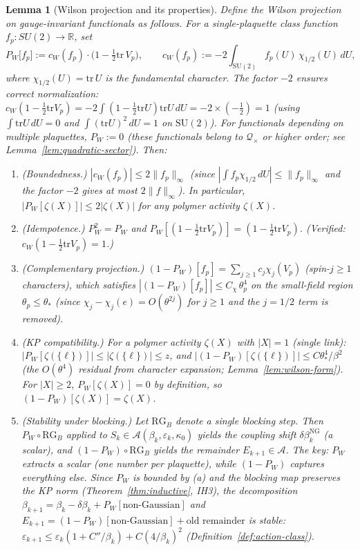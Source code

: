 \documentclass[11pt]{article}
\newtheorem{lemma}[theorem]{Lemma}
\theoremstyle{definition}
\newcommand{\SU}{\mathrm{SU}}
\newcommand{\tr}{\mathrm{tr}}
\newcommand{\R}{\mathbb{R}}
\begin{document}
\begin{lemma}[Wilson projection and its properties]%
\label{lem:wilson-proj}
Define the \emph{Wilson projection} on gauge-invariant
functionals as follows.  For a single-plaquette class function
$f_p:SU(2)\to\R$, set
\begin{equation}\label{eq:wilson-proj}
P_W\bigl[f_p\bigr]
:=c_W(f_p)\cdot\bigl(1-\tfrac{1}{2}\tr\,V_p\bigr),
\qquad
c_W(f_p)
:=-2\int_{\SU(2)}f_p(U)\,\chi_{1/2}(U)\,dU,
\end{equation}
where $\chi_{1/2}(U)=\tr\,U$ is the fundamental character.
The factor $-2$ ensures correct normalization:
$c_W(1-\frac{1}{2}\tr V_p)=-2\int(1-\frac{1}{2}\tr U)
\tr U\,dU=-2\times(-\frac{1}{2})=1$
(using $\int\tr U\,dU=0$ and
$\int(\tr U)^2\,dU=1$ on $\SU(2)$).
For functionals
depending on multiple plaquettes, $P_W:=0$ (these functionals
belong to $\mathcal{Q}_\times$ or higher order;
see Lemma~\ref{lem:quadratic-sector}).
Then:
\begin{enumerate}[nosep,label=(\alph*)]
\item \emph{(Boundedness.)}
$|c_W(f_p)|\le 2\|f_p\|_\infty$ (since
$|\int f_p\chi_{1/2}\,dU|\le\|f_p\|_\infty$
and the factor $-2$ gives at most $2\|f\|_\infty$).
In particular, $|P_W[\zeta(X)]|\le 2|\zeta(X)|$ for
any polymer activity $\zeta(X)$.
\item \emph{(Idempotence.)}
$P_W^2=P_W$ and $P_W[(1-\frac{1}{2}\tr V_p)]=
(1-\frac{1}{2}\tr V_p)$.
(Verified: $c_W(1-\frac{1}{2}\tr V_p)=1$.)
\item \emph{(Complementary projection.)}
$(1-P_W)[f_p]=\sum_{j\ge 1}c_j\chi_j(V_p)$
(spin-$j\ge 1$ characters), which satisfies
$|(1-P_W)[f_p]|\le C_\chi\,\theta_p^4$ on the small-field
region $\theta_p\le\theta_*$ (since $\chi_j-\chi_j(e)
=O(\theta^{2j})$ for $j\ge 1$ and the $j=1/2$ term is
removed).
\item \emph{(KP compatibility.)}
For a polymer activity $\zeta(X)$ with $|X|=1$ (single link):
$|P_W[\zeta(\{\ell\})]|\le|\zeta(\{\ell\})|\le z$, and
$|(1-P_W)[\zeta(\{\ell\})]|\le C\theta_*^4/\beta^2$
(the $O(\theta^4)$ residual from character expansion;
Lemma~\ref{lem:wilson-form}).  For $|X|\ge 2$,
$P_W[\zeta(X)]=0$ by definition, so
$(1-P_W)[\zeta(X)]=\zeta(X)$.
\item \emph{(Stability under blocking.)}
Let $\mathrm{RG}_B$ denote a single blocking step.  Then
$P_W\circ\mathrm{RG}_B$ applied to $S_k\in\mathcal{A}(\beta_k,
\varepsilon_k,\kappa_0)$ yields the coupling shift
$\delta\beta_k^{\mathrm{NG}}$ (a scalar), and
$(1-P_W)\circ\mathrm{RG}_B$ yields the remainder
$E_{k+1}\in\mathcal{A}$.  The key: $P_W$ extracts a
scalar (one number per plaquette), while
$(1-P_W)$ captures everything else.  Since $P_W$ is bounded
by (a) and the blocking map preserves the KP norm
(Theorem~\ref{thm:inductive}, IH3), the decomposition
$\beta_{k+1}=\beta_k-\delta\beta_k+P_W[\text{non-Gaussian}]$
and $E_{k+1}=(1-P_W)[\text{non-Gaussian}]+\text{old remainder}$
is stable: $\varepsilon_{k+1}\le\varepsilon_k(1+C''/\beta_k)
+C(4/\beta_k)^2$ (Definition~\ref{def:action-class}).
\end{enumerate}
\end{lemma}
\end{document}
